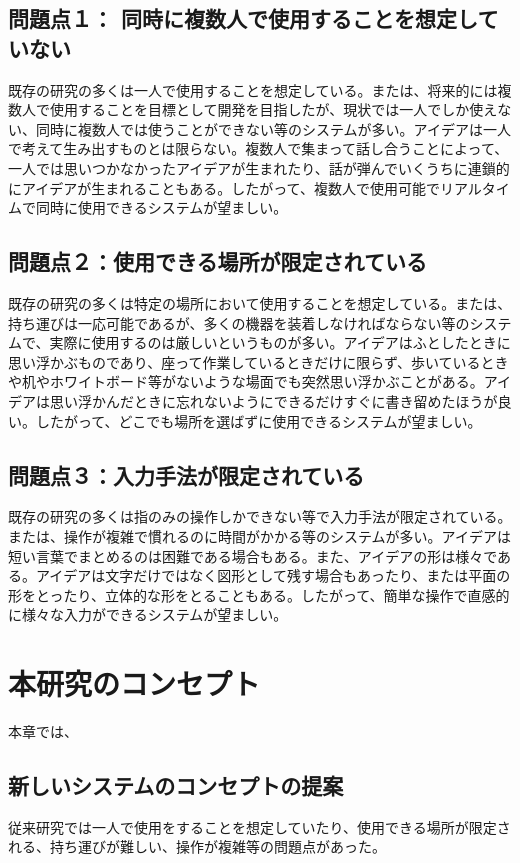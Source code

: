 \documentclass[11pt,a4j, titlepage]{jarticle} %
\begin{document}
\subsection*{問題点１： 同時に複数人で使用することを想定していない}
既存の研究の多くは一人で使用することを想定している。または、将来的には複数人で使用することを目標として開発を目指したが、現状では一人でしか使えない、同時に複数人では使うことができない等のシステムが多い。アイデアは一人で考えて生み出すものとは限らない。複数人で集まって話し合うことによって、一人では思いつかなかったアイデアが生まれたり、話が弾んでいくうちに連鎖的にアイデアが生まれることもある。したがって、複数人で使用可能でリアルタイムで同時に使用できるシステムが望ましい。

\subsection*{問題点２：使用できる場所が限定されている}
既存の研究の多くは特定の場所において使用することを想定している。または、持ち運びは一応可能であるが、多くの機器を装着しなければならない等のシステムで、実際に使用するのは厳しいというものが多い。アイデアはふとしたときに思い浮かぶものであり、座って作業しているときだけに限らず、歩いているときや机やホワイトボード等がないような場面でも突然思い浮かぶことがある。アイデアは思い浮かんだときに忘れないようにできるだけすぐに書き留めたほうが良い。したがって、どこでも場所を選ばずに使用できるシステムが望ましい。

\subsection*{問題点３：入力手法が限定されている}
既存の研究の多くは指のみの操作しかできない等で入力手法が限定されている。または、操作が複雑で慣れるのに時間がかかる等のシステムが多い。アイデアは短い言葉でまとめるのは困難である場合もある。また、アイデアの形は様々である。アイデアは文字だけではなく図形として残す場合もあったり、または平面の形をとったり、立体的な形をとることもある。したがって、簡単な操作で直感的に様々な入力ができるシステムが望ましい。

\newpage
\section{本研究のコンセプト}
本章では、

\subsection{新しいシステムのコンセプトの提案} \label{concept}
従来研究では一人で使用をすることを想定していたり、使用できる場所が限定される、持ち運びが難しい、操作が複雑等の問題点があった。
\end{document}
